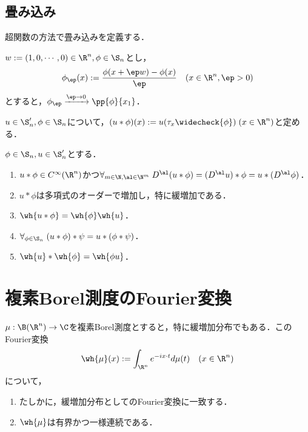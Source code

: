 \documentclass[uplatex,dvipdfmx]{jsreport}
\begin{document}
\subsection{畳み込み}

\begin{tcolorbox}[colframe=ForestGreen, colback=ForestGreen!10!white,breakable,colbacktitle=ForestGreen!40!white,coltitle=black,fonttitle=\bfseries\sffamily,
title=]
    超関数の方法で畳み込みを定義する．
\end{tcolorbox}

\begin{lemma}[Schwartz空間での収束の特徴付け]
    $w:=(1,0,\cdots,0)\in\R^n,\phi\in\S_n$とし，
    \[\phi_\ep(x):=\frac{\phi(x+\ep w)-\phi(x)}{\ep}\quad(x\in\R^n,\ep>0)\]
    とすると，$\phi_\ep\xrightarrow{\ep\to0}\pp{\phi}{x_1}$．
\end{lemma}

\begin{definition}
    $u\in\S'_n,\phi\in\S_n$について，$(u*\phi)(x):=u(\tau_x\widecheck{\phi})\;(x\in\R^n)$と定める．
\end{definition}

\begin{theorem}
    $\phi\in\S_n,u\in\S'_n$とする．
    \begin{enumerate}
        \item $u*\phi\in C^\infty(\R^n)$かつ$\forall_{m\in\N,\al\in\N^m}\;D^\al(u*\phi)=(D^\al u)*\phi=u*(D^\al\phi)$．
        \item $u*\phi$は多項式のオーダーで増加し，特に緩増加である．
        \item $\wh{u*\phi}=\wh{\phi}\wh{u}$．
        \item $\forall_{\phi\in\S_n}\;(u*\phi)*\psi=u*(\phi*\psi)$．
        \item $\wh{u}*\wh{\phi}=\wh{\phi u}$．
    \end{enumerate}
\end{theorem}

\section{複素Borel測度のFourier変換}

\begin{theorem}
    $\mu:\B(\R^n)\to\C$を複素Borel測度とすると，特に緩増加分布でもある．このFourier変換
    \[\wh{\mu}(x):=\int_{\R^n}e^{-ix\cdot t}d\mu(t)\quad(x\in\R^n)\]
    について，
    \begin{enumerate}
        \item たしかに，緩増加分布としてのFourier変換に一致する．
        \item $\wh{\mu}$は有界かつ一様連続である．
    \end{enumerate}
\end{theorem}
\end{document}
